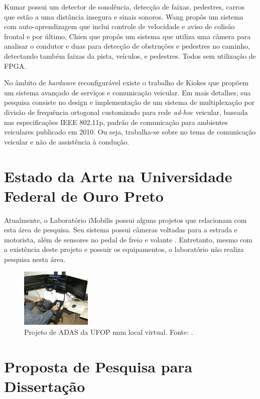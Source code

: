 \documentclass[12pt]{article}
\begin{document}
Kumar \cite{seis} possui um detector de sonolência, detecção de faixas, pedestres, carros que estão a uma distância insegura e sinais sonoros. 
Wang \cite{sete} propôs um sistema com auto-aprendizagem que inclui controle de velocidade e aviso de colisão frontal e por último, Chien \cite{oito} que propôs um sistema que utiliza uma câmera para analisar o condutor e duas para detecção de obstruções e pedestres no caminho, detectando também faixas da pista, veículos, e pedestres. Todos sem utilização de FPGA.

No âmbito de \textit{hardware} reconfigurável existe o trabalho de Kiokes \cite{kiokes2011design} que propõem um sistema avançado de serviços e comunicação veicular. Em mais detalhes, sua pesquisa consiste no design e implementação de um sistema de multiplexação por divisão de frequência ortogonal customizado para rede \textit{ad-hoc} veicular, baseada nas especificações IEEE 802.11p, padrão de comunicação para ambientes veiculares publicado em 2010. Ou seja, trabalha-se sobre no tema de comunicação veicular e não de assistência à condução.

\section{Estado da Arte na Universidade Federal de Ouro Preto}

Atualmente, o Laboratório iMobilis possui alguns projetos que relacionam com esta área de pesquisa. Seu sistema possui câmeras voltadas para a estrada e motorista, além de sensores no pedal de freio e volante \cite{kitt}. Entretanto, mesmo com a existência deste projeto e possuir os equipamentos, o laboratório não realiza pesquisa nesta área.

\begin{figure}[H]
  \centering
  \includegraphics[width=0.3\textwidth]{foto1.png}
  \caption{Projeto de ADAS da UFOP num local virtual. Fonte: \cite{kitt}.}
  \label{fig:naoponderado}
\end{figure}

\section{Proposta de Pesquisa para Dissertação}
\end{document}

